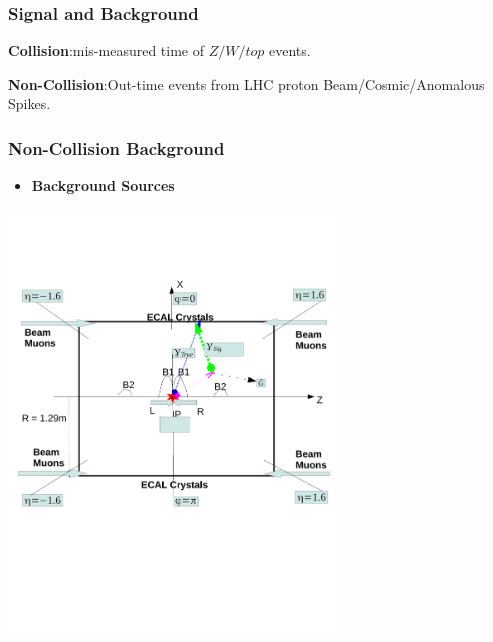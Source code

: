 \documentclass{beamer}
\begin{document}
\begin{frame}
\frametitle{\Huge{Signal and Background}}
\begin{tcolorbox}[colback=UNL@Cream!5,colframe=UNL@LightGrey!70,title=\textcolor{UMN@Maroon}{\textbf{\large{Signal Events}}}]

\end{tcolorbox}

\begin{tcolorbox}[colback=UNL@Cream!5,colframe=UNL@LightGrey!70,title=\textcolor{UMN@Maroon}{\textbf{\large{Background Events}}}]

\begin{itemize}
     \large{
      \item \textbf{Collision}:mis-measured time of $Z/W/top$ events.
      \item \textbf{Non-Collision}:Out-time events from LHC proton Beam/Cosmic/Anomalous Spikes.
      }
 \end{itemize}     
\end{tcolorbox}

     
\end{frame}



\begin{frame}
\frametitle{\huge{Non-Collision Background}}
  \begin{minipage}[t]{\paperwidth}
   \begin{itemize}
    \item \textcolor{UMN@Maroon}{\textbf{Background Sources}} 
   
   
  \end{itemize}
 \includegraphics[height=0.45\textwidth, width=0.65\textwidth]{THESISPLOTS/Background_Delayed_Photon.pdf}
  \end{minipage}
\end{frame}
\end{document}
